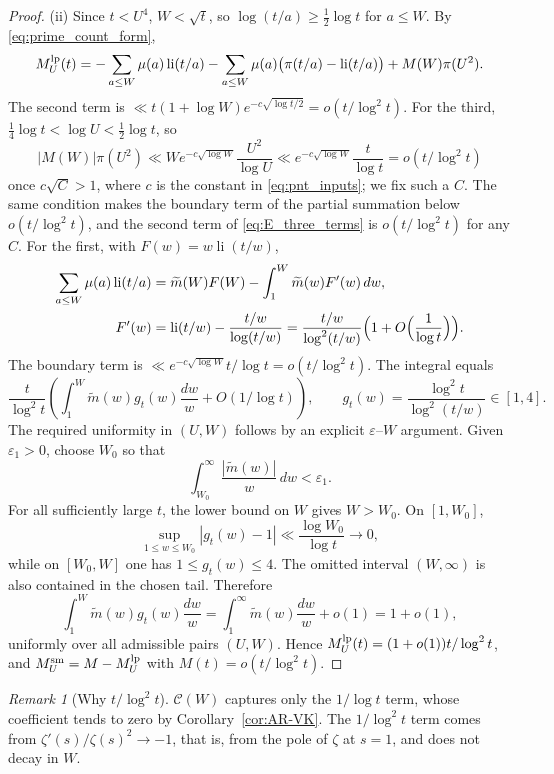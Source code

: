 \documentclass[11pt]{amsart}
\numberwithin{equation}{section}
\theoremstyle{plain}
\theoremstyle{definition}
\theoremstyle{remark}
\newtheorem{remark}[theorem]{Remark}
\DeclareMathOperator{\li}{li}
\newcommand{\Cc}{\mathcal{C}}
\newcommand{\mt}{\widetilde{m}}
\begin{document}
\begin{proof}
(ii) Since $t<U^4$, $W<\sqrt t$, so $\log(t/a)\ge\frac12\log t$ for $a\le W$.
By \eqref{eq:prime_count_form},
\begin{equation}
\label{eq:E_three_terms}
  M^{\rm lp}_U(t)=-\sum_{a\le W}\mu(a)\li(t/a)
  -\sum_{a\le W}\mu(a)\bigl(\pi(t/a)-\li(t/a)\bigr)+M(W)\pi(U^2).
\end{equation}
The second term is $\ll t(1+\log W)e^{-c\sqrt{\log t/2}}=o(t/\log^2t)$. For
the third, $\tfrac14\log t<\log U<\tfrac12\log t$, so
\[
|M(W)|\pi(U^2)\ll We^{-c\sqrt{\log W}}\frac{U^2}{\log U}
\ll e^{-c\sqrt{\log W}}\frac{t}{\log t}=o(t/\log^2t)
\]
once $c\sqrt C>1$, where $c$ is the constant in \eqref{eq:pnt_inputs};
we fix such a $C$. The same condition makes the boundary term of the partial
summation below $o(t/\log^2t)$, and the second term of
\eqref{eq:E_three_terms} is $o(t/\log^2t)$ for any $C$. For the first, with $F(w)=w\li(t/w)$,
\begin{align}
\label{eq:partial_summation_li}
  \sum_{a\le W}\mu(a)\li(t/a)
  &=\mt(W)F(W)-\int_1^W\mt(w)F'(w)\,dw,\\
  F'(w)&=\li(t/w)-\frac{t/w}{\log(t/w)}
  =\frac{t/w}{\log^2(t/w)}\Bigl(1+O\Bigl(\frac1{\log t}\Bigr)\Bigr).\notag
\end{align}
The boundary term is $\ll e^{-c\sqrt{\log W}}t/\log t=o(t/\log^2t)$. The
integral equals
\[
\frac t{\log^2t}\left(\int_1^W\mt(w)g_t(w)\frac{dw}w+O(1/\log t)\right),
\qquad
g_t(w)=\frac{\log^2t}{\log^2(t/w)}\in[1,4].
\]
The required uniformity in $(U,W)$ follows by an explicit
$\varepsilon$--$W$ argument.  Given $\varepsilon_1>0$, choose $W_0$ so that
\[
 \int_{W_0}^\infty\frac{|\mt(w)|}{w}\,dw<\varepsilon_1.
\]
For all sufficiently large $t$, the lower bound on $W$ gives $W>W_0$.  On
$[1,W_0]$,
\[
 \sup_{1\le w\le W_0}|g_t(w)-1|\ll\frac{\log W_0}{\log t}\to0,
\]
while on $[W_0,W]$ one has $1\le g_t(w)\le4$.  The omitted interval
$(W,\infty)$ is also contained in the chosen tail.  Therefore
\[
 \int_1^W\mt(w)g_t(w)\frac{dw}{w}
 =\int_1^\infty\mt(w)\frac{dw}{w}+o(1)=1+o(1),
\]
uniformly over all admissible pairs $(U,W)$. Hence
$M^{\rm lp}_U(t)=(1+o(1))t/\log^2t$, and $M^{\rm sm}_U=M-M^{\rm lp}_U$ with $M(t)=o(t/\log^2t)$.
\end{proof}

\begin{remark}[Why $t/\log^2t$]
\label{rem:why_log2}
$\Cc(W)$ captures only the $1/\log t$ term, whose coefficient tends to zero
by Corollary~\ref{cor:AR-VK}. The $1/\log^2t$ term comes from
$\zeta'(s)/\zeta(s)^2\to-1$, that is, from the pole of $\zeta$ at $s=1$,
and does not decay in $W$.
\end{remark}
\end{document}
